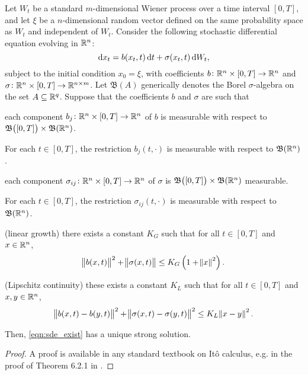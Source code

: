 \begin{theorem}\label{thm:sde_exist_unique}
	Let \(W_t\) be a standard \(m\)-dimensional Wiener process over a time interval \([0,T]\), and let \(\xi\) be a \(n\)-dimensional random vector defined on the same probability space as \(W_t\) and independent of \(W_t\).
	Consider the following stochastic differential equation evolving in \(\mathbb{R}^n\):
	\begin{equation}\label{eqn:sde_exist}
		\dif x_t = b\!\left(x_t, t\right)\dif t + \sigma\!\left(x_t, t\right)\dif W_t,
	\end{equation}
	subject to the initial condition \(x_0 = \xi\), with coefficients \(b\colon \mathbb{R}^n \times [0,T] \to \mathbb{R}^n\) and \(\sigma \colon \mathbb{R}^n \times [0,T] \to \mathbb{R}^{n \times m}\).
	Let \(\mathfrak{B}\!\left(A\right)\) generically denotes the Borel \(\sigma\)-algebra on the set \(A \subseteq \mathbb{R}^q\).
	Suppose that the coefficients \(b\) and \(\sigma\) are such that
	\begin{romanate}
		\item each component \(b_j\colon \mathbb{R}^n \times [0,T] \to \mathbb{R}^n\) of \(b\) is measurable with respect to \(\mathfrak{B}\!\left([0,T]\right) \times \mathfrak{B}\!\left(\mathbb{R}^n\right)\).

		\item For each \(t \in [0,T]\), the restriction \(b_j\!\left(t, \cdot\right)\) is measurable with respect to \(\mathfrak{B}\!\left(\mathbb{R}^n\right)\).

		\item each component \(\sigma_{ij}\colon \mathbb{R}^n \times [0,T] \to \mathbb{R}^n\) of \(\sigma\) is  \(\mathfrak{B}\!\left([0,T]\right) \times \mathfrak{B}\!\left(\mathbb{R}^n\right)\) measurable.

		\item For each \(t \in [0,T]\), the restriction \(\sigma_{ij}\!\left(t, \cdot\right)\) is measurable with respect to \(\mathfrak{B}\!\left(\mathbb{R}^n\right)\).

		\item (linear growth) there exists a constant \(K_G\) such that for all \(t \in [0,T]\) and \(x \in \mathbb{R}^n\),
		\[
			\norm{b\!\left(x,t\right)}^2 + \norm{\sigma\!\left(x,t\right)} \leq K_G\left(1 + \norm{x}^2\right).
		\]

		\item (Lipschitz continuity) these exists a constant \(K_L\) such that for all \(t \in [0,T]\) and \(x,y \in \mathbb{R}^n\),
		\[
			\norm{b\!\left(x,t\right) - b\!\left(y,t\right)}^2 + \norm{\sigma\!\left(x,t\right) - \sigma\!\left(y,t\right)}^2 \leq K_L\norm{x - y}^2.
		\]

	\end{romanate}
	Then, \eqref{eqn:sde_exist} has a unique strong solution.
\end{theorem}
\begin{proof}
	A proof is available in any standard textbook on It\^o calculus, e.g. in the proof of Theorem 6.2.1 in \citet{KallianpurSundar_2014_StochasticAnalysisDiffusion}.
\end{proof}





